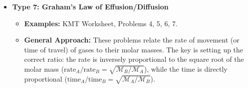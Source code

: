\documentclass{article}
\begin{document}
\begin{itemize}
    \item \textbf{Type 7: Graham's Law of Effusion/Diffusion}
        \begin{itemize}
            \item \textbf{Examples:} KMT Worksheet, Problems 4, 5, 6, 7.
            \item \textbf{General Approach:} These problems relate the rate of movement (or time of travel) of gases to their molar masses. The key is setting up the correct ratio: the rate is inversely proportional to the square root of the molar mass ($\text{rate}_A/\text{rate}_B = \sqrt{\mathcal{M}_B/\mathcal{M}_A}$), while the time is directly proportional ($\text{time}_A/\text{time}_B = \sqrt{\mathcal{M}_A/\mathcal{M}_B}$).
        \end{itemize}
\end{itemize}
\end{document}
